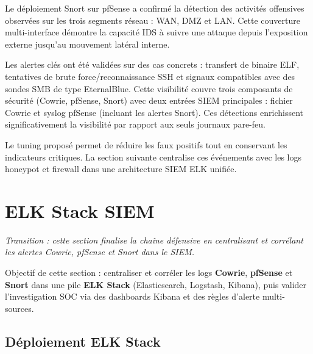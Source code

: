 \documentclass[12pt,a4paper,openany]{report}
\begin{document}
	Le déploiement Snort sur pfSense a confirmé la détection des activités offensives observées sur les trois segments réseau : WAN, DMZ et LAN. Cette couverture multi-interface démontre la capacité IDS à suivre une attaque depuis l'exposition externe jusqu'au mouvement latéral interne.
	
	Les alertes clés ont été validées sur des cas concrets : transfert de binaire ELF, tentatives de brute force/reconnaissance SSH et signaux compatibles avec des sondes SMB de type EternalBlue. Cette visibilité couvre trois composants de sécurité (Cowrie, pfSense, Snort) avec deux entrées SIEM principales : fichier Cowrie et syslog pfSense (incluant les alertes Snort). Ces détections enrichissent significativement la visibilité par rapport aux seuls journaux pare-feu.
	
	Le tuning proposé permet de réduire les faux positifs tout en conservant les indicateurs critiques. La section suivante centralise ces événements avec les logs honeypot et firewall dans une architecture SIEM ELK unifiée.
	
	\section{ELK Stack SIEM}
	\label{sec:elk}
	
	\noindent\textit{Transition : cette section finalise la chaîne défensive en centralisant et corrélant les alertes Cowrie, pfSense et Snort dans le SIEM.}
	
	\begin{tcolorbox}[colback=primary!5!white, colframe=primary, title=\textbf{Objectifs du Chapitre}]
		Objectif de cette section : centraliser et corréler les logs \textbf{Cowrie}, \textbf{pfSense} et \textbf{Snort} dans une pile \textbf{ELK Stack} (Elasticsearch, Logstash, Kibana), puis valider l'investigation SOC via des dashboards Kibana et des règles d'alerte multi-sources.
	\end{tcolorbox}
	
	\subsection{Déploiement ELK Stack}
	\label{sec:elk-deploiement}
	
\end{document}
